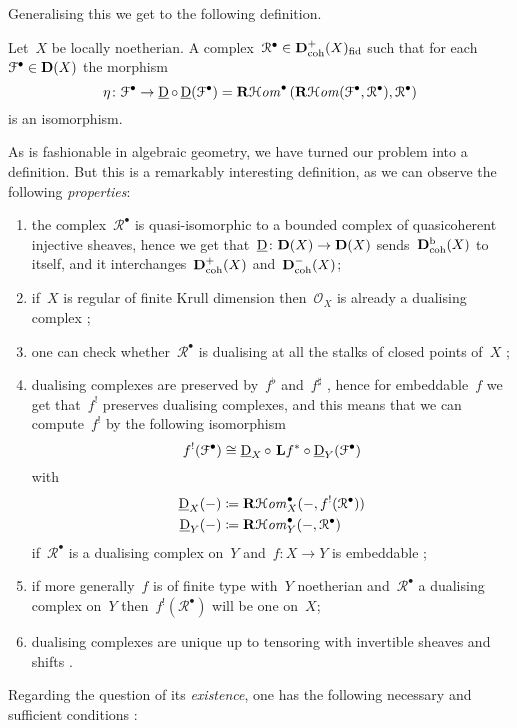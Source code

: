 Generalising this we get to the following definition.
\begin{definition}
  Let~$X$ be locally noetherian. A complex~$\mathcal{R}^\bullet\in\mathbf{D}_{\mathrm{coh}}^+(X)_{\mathrm{fid}}$ such that for each~$\mathcal{F}^\bullet\in\mathbf{D}(X)$ the morphism
  \begin{equation}
    \eta\colon\mathcal{F}^\bullet\to\operatorname{\underline{D}}\circ\operatorname{\underline{D}}(\mathcal{F}^\bullet)=\operatorname{\mathbf{R}\mathcal{H}\mathit{om}}^\bullet\left( \operatorname{\mathbf{R}\mathcal{H}\mathit{om}}(\mathcal{F}^\bullet,\mathcal{R}^\bullet),\mathcal{R}^\bullet \right)
  \end{equation}
  is an isomorphism.
\end{definition}
As is fashionable in algebraic geometry, we have turned our problem into a definition. But this is a remarkably interesting definition, as we can observe the following \emph{properties}:
\begin{enumerate}
  \item the complex~$\mathcal{R}^\bullet$ is quasi-isomorphic to a bounded complex of quasicoherent injective sheaves, hence we get that~$\operatorname{\underline{D}}\colon\mathbf{D}(X)\to\mathbf{D}(X)$ sends~$\mathbf{D}_{\mathrm{coh}}^{\mathrm{b}}(X)$ to itself, and it interchanges~$\mathbf{D}_{\mathrm{coh}}^+(X)$ and~$\mathbf{D}_{\mathrm{coh}}^-(X)$;
  \item if~$X$ is regular of finite Krull dimension then~$\mathcal{O}_X$ is already a dualising complex \cite[example V.2.2]{hartshorne-residues-and-duality};
  \item one can check whether~$\mathcal{R}^\bullet$ is dualising at all the stalks of closed points of~$X$ \cite[corollary V.2.3]{hartshorne-residues-and-duality};
  \item dualising complexes are preserved by~$f^\flat$ and~$f^\sharp$ \cite[proposition V.2.4 and theorem V.8.3]{hartshorne-residues-and-duality}, hence for embeddable~$f$ we get that~$f^!$ preserves dualising complexes, and this means that we can compute~$f^!$ by the following isomorphism
    \begin{equation}
      f^!(\mathcal{F}^\bullet)\cong\operatorname{\underline{D}}_X\circ\ \mathbf{L} f^*\circ\operatorname{\underline{D}}_Y(\mathcal{F}^\bullet)
    \end{equation}
    with
    \begin{equation}
      \begin{aligned}
        \operatorname{\underline{D}}_X(-)&\coloneqq\operatorname{\mathbf{R}\mathcal{H}\mathit{om}}_X^\bullet(-,f^!(\mathcal{R}^\bullet)) \\
        \operatorname{\underline{D}}_Y(-)&\coloneqq\operatorname{\mathbf{R}\mathcal{H}\mathit{om}}_Y^\bullet(-,\mathcal{R}^\bullet)
      \end{aligned}
    \end{equation}
    if~$\mathcal{R}^\bullet$ is a dualising complex on~$Y$ and~$f\colon X\to Y$ is embeddable \cite[proposition V.8.5]{hartshorne-residues-and-duality};
  \item if more generally~$f$ is of finite type with~$Y$ noetherian and~$\mathcal{R}^\bullet$ a dualising complex on~$Y$ then~$f^!(\mathcal{R}^\bullet)$ will be one on~$X$;
  \item dualising complexes are unique up to tensoring with invertible sheaves and shifts \cite[theorem V.3.1]{hartshorne-residues-and-duality}.
\end{enumerate}
Regarding the question of its \emph{existence}, one has the following necessary and sufficient conditions \cite[\S V.10]{hartshorne-residues-and-duality}:
